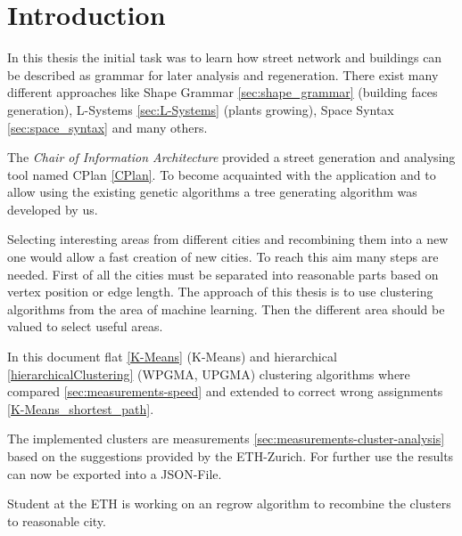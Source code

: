 \chapter{Introduction}
In this thesis the initial task was to learn how street network and buildings can be described as grammar for later analysis and regeneration. There exist many different approaches like Shape Grammar \ref{sec:shape_grammar} (building faces generation), L-Systems \ref{sec:L-Systems} (plants growing), Space Syntax \ref{sec:space_syntax} and many others. 

The \textit{Chair of Information Architecture} provided a street generation and analysing tool named CPlan \ref{CPlan}. To become acquainted with the application and to allow using the existing genetic algorithms a tree generating algorithm was developed by us. 

Selecting interesting areas from different cities and recombining them into a new one would allow a fast creation of new cities. To reach this aim many steps are needed. First of all the cities must be separated into reasonable parts based on vertex position or edge length. The approach of this thesis is to use clustering algorithms from the area of machine learning. Then the different area should be valued to select useful areas.

In this document flat \ref{K-Means} (K-Means) and hierarchical \ref{hierarchicalClustering} (WPGMA, UPGMA) clustering algorithms where compared \ref{sec:measurements-speed} and extended to correct wrong assignments \ref{K-Means_shortest_path}. %

The implemented clusters are measurements \ref{sec:measurements-cluster-analysis} based on the suggestions provided by the ETH-Zurich. For further use the results can now be exported into a JSON-File. %

Student at the ETH is working on an regrow algorithm to recombine the clusters to reasonable city.
